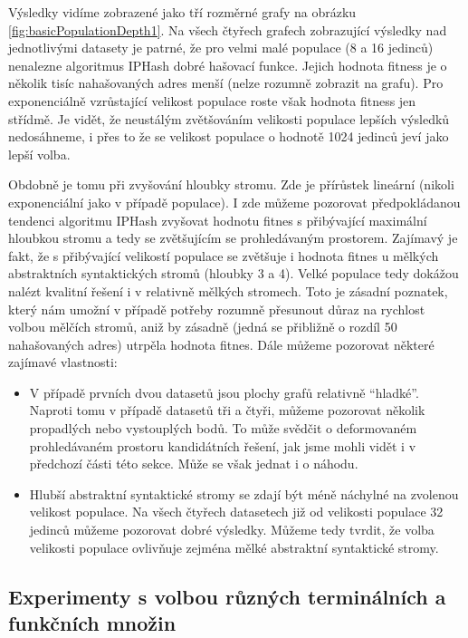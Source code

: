 Výsledky vidíme zobrazené jako tří rozměrné grafy na obrázku \ref{fig:basicPopulationDepth1}. Na všech čtyřech grafech
zobrazující výsledky nad jednotlivými datasety je patrné, že pro velmi malé populace (8 a 16 jedinců) nenalezne algoritmus
IPHash dobré hašovací funkce. Jejich hodnota fitness je o několik tisíc nahašovaných adres menší (nelze rozumně zobrazit na grafu).
Pro exponenciálně vzrůstající velikost populace roste však hodnota fitness jen střídmě. Je vidět, že neustálým zvětšováním
velikosti populace lepších výsledků nedosáhneme, i přes to že se velikost populace o hodnotě 1024 jedinců jeví jako lepší volba.

Obdobně je tomu při zvyšování hloubky stromu. Zde je přírůstek lineární (nikoli exponenciální jako v případě populace). I zde můžeme
pozorovat předpokládanou tendenci algoritmu IPHash zvyšovat hodnotu fitnes s přibývající maximální hloubkou stromu a tedy se 
zvětšujícím se prohledávaným prostorem. Zajímavý je fakt, že s přibývající velikostí populace se zvětšuje i hodnota fitnes u mělkých
abstraktních syntaktických stromů (hloubky 3 a 4). Velké populace tedy dokážou nalézt kvalitní řešení i v relativně mělkých stromech.
Toto je zásadní poznatek, který nám umožní v případě potřeby rozumně přesunout důraz na rychlost volbou mělčích stromů, aniž by
zásadně (jedná se přibližně o rozdíl 50 nahašovaných adres) utrpěla hodnota fitnes. Dále můžeme pozorovat některé zajímavé vlastnosti:

\begin{itemize}
	\item V případě prvních dvou datasetů jsou plochy grafů relativně ``hladké''. Naproti tomu v
		případě datasetů tři a čtyři, můžeme pozorovat několik propadlých nebo vystouplých bodů. To může svědčit o deformovaném
		prohledávaném prostoru kandidátních řešení, jak jsme mohli vidět i v předchozí části této sekce. Může se však jednat i o náhodu.
		
	\item Hlubší abstraktní syntaktické stromy se zdají být méně náchylné na zvolenou velikost populace. Na všech čtyřech datasetech již
		od velikosti populace 32 jedinců můžeme pozorovat dobré výsledky. Můžeme tedy tvrdit, že volba velikosti populace ovlivňuje zejména
		mělké abstraktní syntaktické stromy. 
\end{itemize}


\subsection{Experimenty s volbou různých terminálních a funkčních množin}

